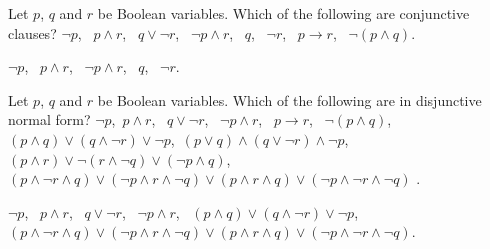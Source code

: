 \begin{requ}
Let $p$, $q$ and $r$ be Boolean variables. Which of the following are conjunctive clauses? 
$\neg p$, \, $p\wedge r$, \, $q\vee \neg r$, \, $\neg p \wedge r$, \, $q$, \, $\neg r$, \, $p\rightarrow r$, \, $\neg(p\wedge q)$.
\begin{requanswer}
$\neg p$, \, $p\wedge r$, \, $\neg p \wedge r$, \, $q$,  \, $\neg r$.
\end{requanswer}
\end{requ}

\begin{requ}
Let $p$, $q$ and $r$ be Boolean variables. Which of the following are in disjunctive normal form? 
$\neg p$,\, 
$p\wedge r$, \, 
$q\vee \neg r$, \, 
$\neg p \wedge r$, \, 
$p\rightarrow r$, \, 
$\neg(p\wedge q)$,\, 
$(p\wedge q)\vee (q\wedge \neg r)\vee \neg p$,\, 
$(p\vee q)\wedge (q\vee \neg r)\wedge \neg p$,\, 
$(p\wedge r)\vee\neg(r\wedge \neg q)\vee (\neg p \wedge q)$,\, 
$(p\wedge \neg r\wedge q)\vee (\neg p\wedge r \wedge \neg q)\vee(p\wedge r \wedge q)\vee(\neg p\wedge \neg r \wedge \neg q)$
.
\begin{requanswer}
$\neg p$, \, 
$p\wedge r$, \, 
$q\vee \neg r$, \, 
$\neg p \wedge r$, \, 
$(p\wedge q)\vee (q\wedge \neg r)\vee \neg p$, \, 
$(p\wedge \neg r\wedge q)\vee (\neg p\wedge r \wedge \neg q)\vee(p\wedge r \wedge q)\vee(\neg p\wedge \neg r \wedge \neg q)$.
\end{requanswer}
\end{requ}

